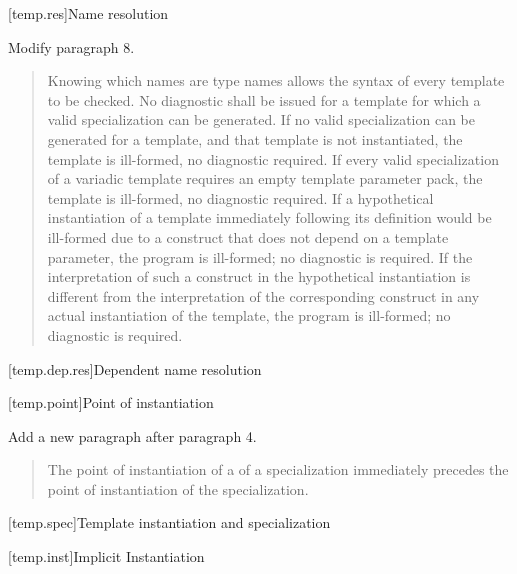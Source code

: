 [temp.res]{Name resolution}

Modify paragraph 8.

\begin{quote}
\setcounter{Paras}{7}
\pnum
Knowing which names are type names allows the syntax of every
template to be checked. No diagnostic shall be issued for a template
for which a valid specialization can be generated. If no valid
specialization can be generated for a template, and that template is
not instantiated, the template is ill-formed, no diagnostic
required. If every valid specialization of a variadic template
requires an empty template parameter pack, the template is
ill-formed, no diagnostic required. 
% 
% 
% 
If a hypothetical instantiation of a template immediately following
its definition would be ill-formed due to a construct that does not
depend on a template parameter, the program is ill-formed; no
diagnostic is required. If the interpretation of such a construct in
the hypothetical instantiation is different from the interpretation
of the corresponding construct in any actual instantiation of the
template, the program is ill-formed; no diagnostic is required.
\end{quote}

\setcounter{subsection}{3}
[temp.dep.res]{Dependent name resolution}

[temp.point]{Point of instantiation}

Add a new paragraph after paragraph 4.

\begin{quote}
\setcounter{Paras}{4}
\begin{addedblock}
\pnum
The point of instantiation of a  of a
specialization immediately precedes the point of instantiation of
the specialization.
\end{addedblock}
\end{quote}


[temp.spec]{Template instantiation and specialization}

[temp.inst]{Implicit Instantiation}
    
